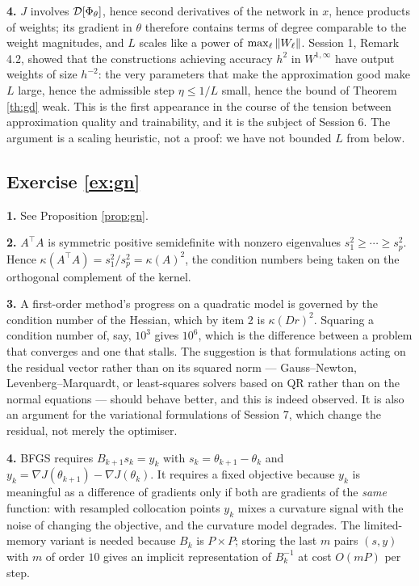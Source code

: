 \documentclass[11pt,a4paper]{article}
\begin{document}
\textbf{4.} $J$ involves $\mathcal{D}[\Phi_\theta]$, hence second derivatives of the network in $x$, hence
products of weights; its gradient in $\theta$ therefore contains terms of degree comparable to the
weight magnitudes, and $L$ scales like a power of $\max_\ell\left\lVert W_\ell \right\rVert$. Session 1,
Remark 4.2, showed that the constructions achieving accuracy $h^2$ in $W^{1,\infty}$ have output
weights of size $h^{-2}$: the very parameters that make the approximation good make $L$ large, hence
the admissible step $\eta \le 1/L$ small, hence the bound of Theorem \ref{th:gd} weak. This is the
first appearance in the course of the tension between approximation quality and trainability, and it
is the subject of Session 6. The argument is a scaling heuristic, not a proof: we have not bounded
$L$ from below.

\subsection*{Exercise \ref{ex:gn}}

\textbf{1.} See Proposition \ref{prop:gn}.

\textbf{2.} $A^{\!\top}A$ is symmetric positive semidefinite with nonzero eigenvalues
$s_1^2 \ge \cdots \ge s_p^2$. Hence
$\kappa(A^{\!\top}A) = s_1^2/s_p^2 = \kappa(A)^2$, the condition numbers being taken on the
orthogonal complement of the kernel.

\textbf{3.} A first-order method's progress on a quadratic model is governed by the condition number
of the Hessian, which by item 2 is $\kappa(Dr)^2$. Squaring a condition number of, say, $10^3$ gives
$10^6$, which is the difference between a problem that converges and one that stalls. The suggestion
is that formulations acting on the residual vector rather than on its squared norm --- Gauss--Newton,
Levenberg--Marquardt, or least-squares solvers based on QR rather than on the normal equations ---
should behave better, and this is indeed observed. It is also an argument for the variational
formulations of Session 7, which change the residual, not merely the optimiser.

\textbf{4.} BFGS requires $B_{k+1}s_k = y_k$ with $s_k = \theta_{k+1}-\theta_k$ and
$y_k = \nabla J(\theta_{k+1}) - \nabla J(\theta_k)$. It requires a fixed objective because $y_k$ is
meaningful as a difference of gradients only if both are gradients of the \emph{same} function:
with resampled collocation points $y_k$ mixes a curvature signal with the noise of changing the
objective, and the curvature model degrades. The limited-memory variant is needed because $B_k$ is
$P \times P$; storing the last $m$ pairs $(s,y)$ with $m$ of order $10$ gives an implicit
representation of $B_k^{-1}$ at cost $O(mP)$ per step.
\end{document}
